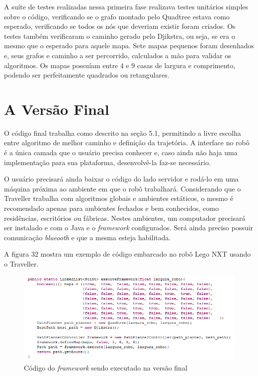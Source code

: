 A suíte de testes realizadas nessa primeira fase realizava testes unitários simples sobre o código, verificando se o grafo montado pelo Quadtree estava como esperado, verificando se todos os nós que deveriam existir foram criados. Os testes também verificaram o caminho gerado pelo Djikstra, ou seja, se era o mesmo que o esperado para aquele mapa. Sete mapas pequenos foram desenhados e, seus grafos e caminho a ser percorrido, calculados a mão para validar os algoritmos. Os mapas possuíam entre 4 e 9 casas de largura e comprimento, podendo ser perfeitamente quadrados ou retangulares.

\section{A Versão Final}

O código final trabalha como descrito na seção 5.1, permitindo a livre escolha entre algoritmo de melhor caminho e definição da trajetória. A interface no robô é a única camada que o usuário precisa conhecer e, caso ainda não haja uma implementação para sua plataforma, desenvolvê-la faz-se necessário.

O usuário precisará ainda baixar o código do lado servidor e rodá-lo em uma máquina próxima ao ambiente em que o robô trabalhará. Considerando que o Traveller trabalha com algoritmos globais e ambientes estáticos, o mesmo é recomendado apenas para ambientes fechados e bem conhecidos, como residências, escritórios ou fábricas. Nestes ambientes, um computador precisará ser instalado e com o Java e o \textit{framework} configurados. Será ainda preciso possuir comunicação \textit{blueooth} e que a mesma esteja habilitada.

A figura 32 mostra um exemplo de código embarcado no robô Lego NXT usando o Traveller.

\begin{figure}[h]
	\centering
	\label{fig32}
		\includegraphics[keepaspectratio=true,scale=0.8]{figuras/codigofinal.PNG}
	\caption{Código do \textit{framework} sendo executado na versão final}
\end{figure}

